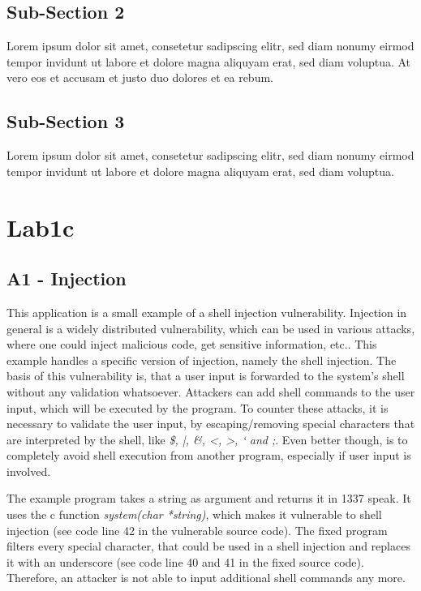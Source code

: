 \documentclass[12pt,a4paper,titlepage,oneside]{scrartcl}
\begin{document}
\subsection{Sub-Section 2}
Lorem ipsum dolor sit amet, consetetur sadipscing elitr, sed diam nonumy eirmod tempor invidunt ut labore et dolore magna aliquyam erat, sed diam voluptua. At vero eos et accusam et justo duo dolores et ea rebum. 

\subsection{Sub-Section 3}
Lorem ipsum dolor sit amet, consetetur sadipscing elitr, sed diam nonumy eirmod tempor invidunt ut labore et dolore magna aliquyam erat, sed diam voluptua. 

\section{Lab1c}

\subsection{A1 - Injection}
This application is a small example of a shell injection vulnerability. Injection in general is a widely distributed vulnerability, which can be used
in various attacks, where one could inject malicious code, get sensitive information, etc.. This example handles a specific version of injection, namely the shell injection. The basis of this vulnerability is, that a user input is forwarded to the system's shell without any validation whatsoever. Attackers can add shell commands to the user input, which will be executed by the program. To counter these attacks, it is necessary to validate the user input, by escaping/removing special characters that are interpreted by the shell, like  \textit{\$, |, \&, <, >, ` and ;}. Even better though, is to completely avoid shell execution from another program, especially if user input is involved.

The example program takes a string as argument and returns it in 1337 speak. It uses the c function
\textit{system(char *string)}, which makes it vulnerable to shell injection (see code line 42 in the vulnerable source code). The fixed program filters
every special character, that could be used in a shell injection and replaces it with an
underscore (see code line 40 and 41 in the fixed source code). Therefore, an attacker is not able to input additional shell commands any more.
\end{document}
